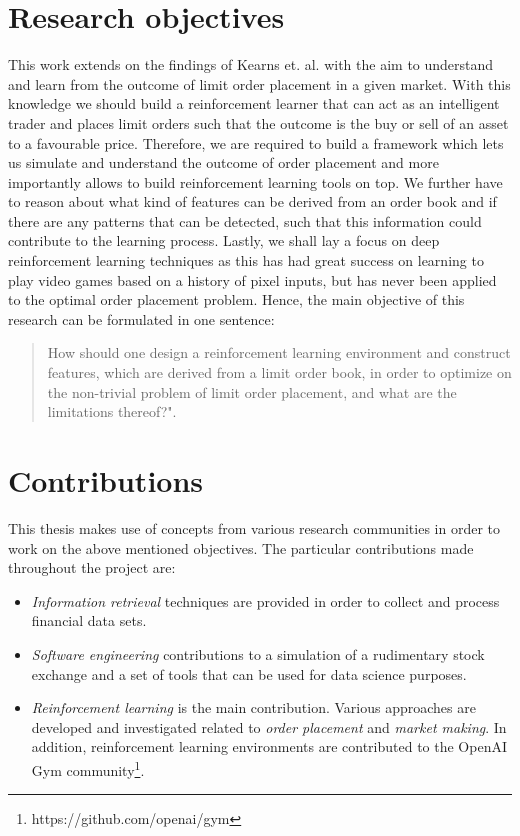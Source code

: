 \section{Research objectives}

This work extends on the findings of Kearns et. al. \cite{nevmyvaka2006reinforcement} with the aim to understand and learn from the outcome of limit order placement in a given market.
With this knowledge we should build a reinforcement learner that can act as an intelligent trader and places limit orders such that the outcome is the buy or sell of an asset to a favourable price.
Therefore, we are required to build a framework which lets us simulate and understand the outcome of order placement and more importantly allows to build reinforcement learning tools on top.
We further have to reason about what kind of features can be derived from an order book and if there are any patterns that can be detected, such that this information could contribute to the learning process.
Lastly, we shall lay a focus on deep reinforcement learning techniques as this has had great success on learning to play video games \cite{mnih2013playing} based on a history of pixel inputs, but has never been applied to the optimal order placement problem.
Hence, the main objective of this research can be formulated in one sentence: \begin{quote}
    How should one design a reinforcement learning environment and construct features, which are derived from a limit order book, in order to optimize on the non-trivial problem of limit order placement, and what are the limitations thereof?".
\end{quote}

\section{Contributions}

This thesis makes use of concepts from various research communities in order to work on the above mentioned objectives.
The particular contributions made throughout the project are:
\begin{itemize}
    \item \textit{Information retrieval} techniques are provided in order to collect and process financial data sets.
    \item \textit{Software engineering} contributions to a simulation of a rudimentary stock exchange and a set of tools that can be used for data science purposes.
    \item \textit{Reinforcement learning} is the main contribution. Various approaches are developed and investigated related to \textit{order placement} and \textit{market making}.
    In addition, reinforcement learning environments are contributed to the OpenAI Gym community\footnote{https://github.com/openai/gym}.
\end{itemize}


